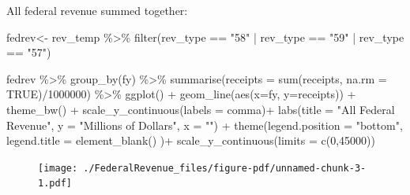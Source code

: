 \documentclass[
  letterpaper,
  DIV=11,
  numbers=noendperiod]{scrreport}
\newenvironment{Shaded}{\begin{snugshade}}{\end{snugshade}}
\newcommand{\AttributeTok}[1]{\textcolor[rgb]{0.40,0.45,0.13}{#1}}
\newcommand{\ConstantTok}[1]{\textcolor[rgb]{0.56,0.35,0.01}{#1}}
\newcommand{\DecValTok}[1]{\textcolor[rgb]{0.68,0.00,0.00}{#1}}
\newcommand{\FunctionTok}[1]{\textcolor[rgb]{0.28,0.35,0.67}{#1}}
\newcommand{\NormalTok}[1]{\textcolor[rgb]{0.00,0.23,0.31}{#1}}
\newcommand{\OtherTok}[1]{\textcolor[rgb]{0.00,0.23,0.31}{#1}}
\newcommand{\SpecialCharTok}[1]{\textcolor[rgb]{0.37,0.37,0.37}{#1}}
\newcommand{\StringTok}[1]{\textcolor[rgb]{0.13,0.47,0.30}{#1}}
\begin{document}
\hfill\break
All federal revenue summed together:

\begin{Shaded}
\begin{Highlighting}[]
\NormalTok{fedrev}\OtherTok{\textless{}{-}}\NormalTok{ rev\_temp }\SpecialCharTok{\%\textgreater{}\%} 
  \FunctionTok{filter}\NormalTok{(rev\_type }\SpecialCharTok{==} \StringTok{"58"} \SpecialCharTok{|}\NormalTok{ rev\_type }\SpecialCharTok{==} \StringTok{"59"} \SpecialCharTok{|}\NormalTok{ rev\_type }\SpecialCharTok{==} \StringTok{"57"}\NormalTok{) }

\NormalTok{fedrev }\SpecialCharTok{\%\textgreater{}\%} 
  \FunctionTok{group\_by}\NormalTok{(fy) }\SpecialCharTok{\%\textgreater{}\%} 
  \FunctionTok{summarise}\NormalTok{(}\AttributeTok{receipts =} \FunctionTok{sum}\NormalTok{(receipts, }\AttributeTok{na.rm =} \ConstantTok{TRUE}\NormalTok{)}\SpecialCharTok{/}\DecValTok{1000000}\NormalTok{) }\SpecialCharTok{\%\textgreater{}\%} 
  \FunctionTok{ggplot}\NormalTok{() }\SpecialCharTok{+}
  \FunctionTok{geom\_line}\NormalTok{(}\FunctionTok{aes}\NormalTok{(}\AttributeTok{x=}\NormalTok{fy, }\AttributeTok{y=}\NormalTok{receipts)) }\SpecialCharTok{+}
      \FunctionTok{theme\_bw}\NormalTok{() }\SpecialCharTok{+}
  \FunctionTok{scale\_y\_continuous}\NormalTok{(}\AttributeTok{labels =}\NormalTok{ comma)}\SpecialCharTok{+}
  \FunctionTok{labs}\NormalTok{(}\AttributeTok{title =} \StringTok{"All Federal Revenue"}\NormalTok{, }
       \AttributeTok{y =} \StringTok{"Millions of Dollars"}\NormalTok{, }\AttributeTok{x =} \StringTok{""}\NormalTok{) }\SpecialCharTok{+} 
  \FunctionTok{theme}\NormalTok{(}\AttributeTok{legend.position =} \StringTok{"bottom"}\NormalTok{, }\AttributeTok{legend.title =} \FunctionTok{element\_blank}\NormalTok{()  )}\SpecialCharTok{+}
    \FunctionTok{scale\_y\_continuous}\NormalTok{(}\AttributeTok{limits =} \FunctionTok{c}\NormalTok{(}\DecValTok{0}\NormalTok{,}\DecValTok{45000}\NormalTok{))}
\end{Highlighting}
\end{Shaded}

\begin{figure}[H]

{\centering \texttt{[image: ./FederalRevenue\_files/figure-pdf/unnamed-chunk-3-1.pdf]}

}

\end{figure}
\end{document}
